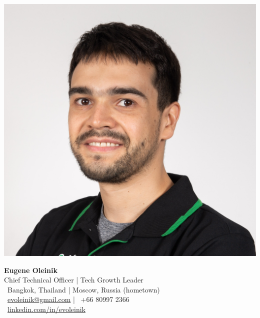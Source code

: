 \documentclass[11pt,a4paper]{article}
\begin{document}
\begin{center}
    \colorbox{headerbg}{\parbox{\textwidth}{
        \vspace{0.5em}
        \hspace{0.25em}
        \begin{minipage}[c]{0.2\textwidth}
            \includegraphics[width=\linewidth]{headshot.jpg} %
        \end{minipage}\hspace{0.5em}\hfill
        \begin{minipage}[c]{0.75\textwidth}
            {\Huge\textbf{Eugene Oleinik}} \\[0.3em]
            {\Large\color{secondarycolor} Chief Technical Officer | Tech Growth Leader} \\[0.5em]
            {\color{secondarycolor}
            \faMapMarker \, Bangkok, Thailand | Moscow, Russia (hometown) \\[0.2em]
            \faEnvelope \, \href{mailto:evoleinik@gmail.com}{evoleinik@gmail.com} | \faPhone \, +66 80997 2366 \\[0.2em]
            \faLinkedin \, \href{http://linkedin.com/in/evoleinik}{linkedin.com/in/evoleinik}}
        \end{minipage}
        \vspace{0.5em}
    }}
\end{center}
\end{document}
